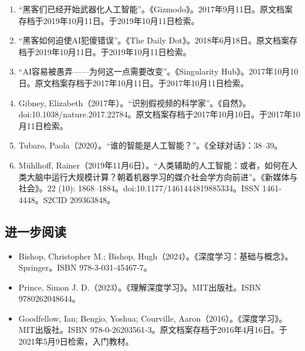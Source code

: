 \begin{enumerate}
\item “黑客们已经开始武器化人工智能”。《Gizmodo》。2017年9月11日。原文档案存档于2019年10月11日。于2019年10月11日检索。
\item “黑客如何迫使AI犯傻错误”。《The Daily Dot》。2018年6月18日。原文档案存档于2019年10月11日。于2019年10月11日检索。
\item “AI容易被愚弄——为何这一点需要改变”。《Singularity Hub》。2017年10月10日。原文档案存档于2017年10月11日。于2017年10月11日检索。
\item Gibney, Elizabeth（2017年）。“识别假视频的科学家”。《自然》。doi:10.1038/nature.2017.22784。原文档案存档于2017年10月10日。于2017年10月11日检索。
\item Tubaro, Paola（2020）。“谁的智能是人工智能？”。《全球对话》：38–39。
\item Mühlhoff, Rainer（2019年11月6日）。“人类辅助的人工智能：或者，如何在人类大脑中运行大规模计算？朝着机器学习的媒介社会学方向前进”。《新媒体与社会》。22 (10): 1868–1884。doi:10.1177/1461444819885334。ISSN 1461-4448。S2CID 209363848。
\end{enumerate}
\subsection{进一步阅读}
\begin{itemize}
\item Bishop, Christopher M.; Bishop, Hugh（2024）。《深度学习：基础与概念》。Springer。ISBN 978-3-031-45467-7。
\item Prince, Simon J. D.（2023）。《理解深度学习》。MIT出版社。ISBN 9780262048644。
\item Goodfellow, Ian; Bengio, Yoshua; Courville, Aaron（2016）。《深度学习》。MIT出版社。ISBN 978-0-26203561-3。原文档案存档于2016年4月16日。于2021年5月9日检索，入门教材。
\end{itemize}